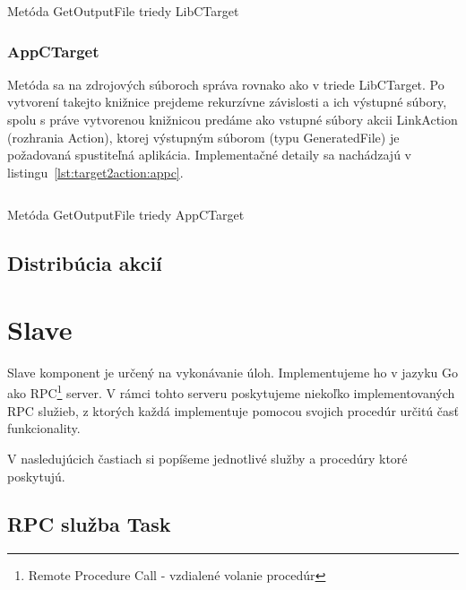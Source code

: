 \begin{listing}[H]
  \inputminted[frame=lines,framesep=2mm,linenos,fontsize=\scriptsize,firstline=48,lastline=73]{go}{/home/pepol/src/imterra/forge/client/target/target.go}
  \caption{Metóda GetOutputFile triedy LibCTarget}
  \label{lst:target2action:libc}
\end{listing}

\subsubsection{AppCTarget}
Metóda sa na zdrojových súboroch správa rovnako ako v triede LibCTarget. Po
vytvorení takejto knižnice prejdeme rekurzívne závislosti a ich výstupné
súbory, spolu s práve vytvorenou knižnicou predáme ako vstupné súbory
akcii LinkAction (rozhrania Action), ktorej výstupným súborom (typu GeneratedFile)
je požadovaná spustiteľná aplikácia. Implementačné detaily sa nachádzajú v
listingu~\ref{lst:target2action:appc}.

\begin{listing}[H]
  \inputminted[frame=lines,framesep=2mm,linenos,fontsize=\scriptsize,firstline=91,lastline=129]{go}{/home/pepol/src/imterra/forge/client/target/target.go}
  \caption{Metóda GetOutputFile triedy AppCTarget}
  \label{lst:target2action:appc}
\end{listing}

\subsection{Distrib\'{u}cia akci\'{i}}
\label{sec:master:distribution}


\section{Slave}
\label{sec:slave}

Slave komponent je určený na vykonávanie úloh. Implementujeme ho v jazyku Go
ako RPC\footnote{Remote Procedure Call - vzdialené volanie procedúr} server.
V rámci tohto serveru poskytujeme niekoľko implementovaných RPC služieb,
z ktorých každá implementuje pomocou svojich procedúr určitú časť funkcionality.

V nasledujúcich častiach si popíšeme jednotlivé služby a procedúry ktoré
poskytujú.

\subsection{RPC služba Task}
\label{sec:slave:rpc:action}

